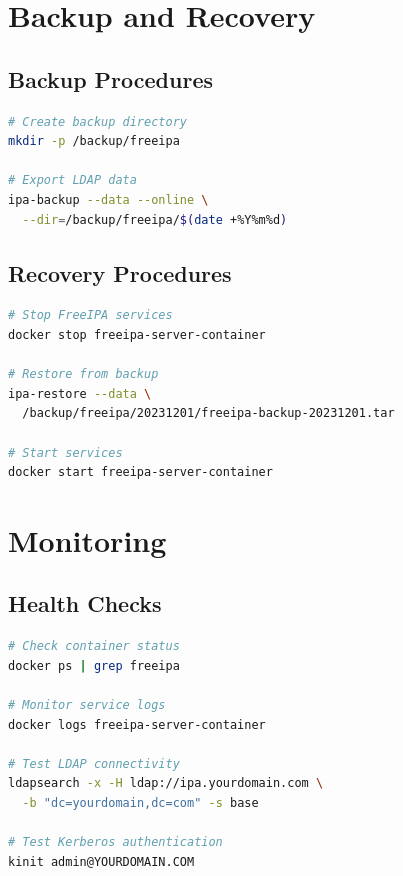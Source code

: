 \documentclass[12pt,a4paper]{report}
\begin{document}
\section{Backup and Recovery}

\subsection{Backup Procedures}

\begin{lstlisting}[language=bash,caption=FreeIPA Backup]
# Create backup directory
mkdir -p /backup/freeipa

# Export LDAP data
ipa-backup --data --online \
  --dir=/backup/freeipa/$(date +%Y%m%d)
\end{lstlisting}

\subsection{Recovery Procedures}

\begin{lstlisting}[language=bash,caption=FreeIPA Recovery]
# Stop FreeIPA services
docker stop freeipa-server-container

# Restore from backup
ipa-restore --data \
  /backup/freeipa/20231201/freeipa-backup-20231201.tar

# Start services
docker start freeipa-server-container
\end{lstlisting}

\section{Monitoring}

\subsection{Health Checks}

\begin{lstlisting}[language=bash,caption=Service Health Monitoring]
# Check container status
docker ps | grep freeipa

# Monitor service logs
docker logs freeipa-server-container

# Test LDAP connectivity
ldapsearch -x -H ldap://ipa.yourdomain.com \
  -b "dc=yourdomain,dc=com" -s base

# Test Kerberos authentication
kinit admin@YOURDOMAIN.COM
\end{lstlisting}
\end{document}

